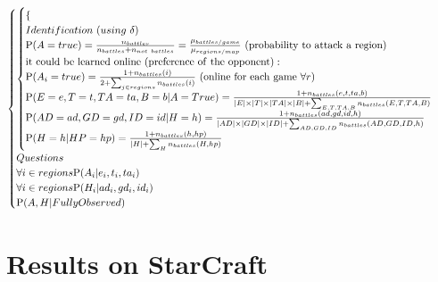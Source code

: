 \begin{eqnarray*}
\begin{cases}
\begin{cases}
\begin{cases}
        \end{cases}\\
    Identification\ (using\ \delta)\\
\PP(A=true)= \frac{n_{battles}}{n_{battles}+n_{not\ battles}} = \frac{\mu_{battles/game}}{\mu_{regions/map}}\ \mathrm{(probability\ to\ attack\ a\ region)}\\
\mathrm{it\ could\ be\ learned\ online\ (preference\ of\ the\ opponent):}\\
\PP(A_i=true) = \frac{1 + n_{battles}(i)}{2 + \sum_{j \in regions}n_{battles}(i)}\ \mathrm{(online\ for\ each\ game\ }\forall r\mathrm{)}\\
\PP(E=e,T=t,TA=ta,B=b|A=True) = \frac{1+n_{battles}(e,t,ta,b)}{\abs{E} \times \abs{T} \times \abs{TA} \times \abs{B} + \sum_{E,T,TA,B} n_{battles}(E,T,TA,B)} \\
\PP(AD=ad,GD=gd,ID=id|H=h) = \frac{1+n_{battles}(ad,gd,id,h)}{\abs{AD} \times \abs{GD} \times \abs{ID} + \sum_{AD,GD,ID} n_{battles}(AD,GD,ID,h)} \\
\PP(H=h|HP=hp) = \frac{1 + n_{battles}(h,hp)}{\abs{H} + \sum_{H} n_{battles}(H,hp)}\\
    \end{cases}\\
Questions\\
\forall i \in regions \PP(A_i|e_i,t_i,ta_i)\\ %
\forall i \in regions \PP(H_i|ad_i,gd_i,id_i) \\
\PP(A,H|FullyObserved)\\
\end{cases}
\label{bp:BayesianTactician}
\end{eqnarray*}


\section{Results on StarCraft}
\label{sec:tacticalresults}


